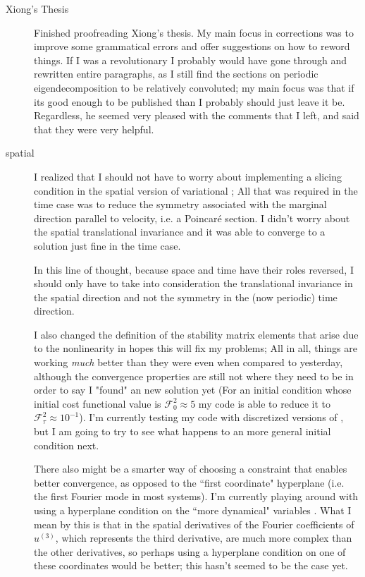 \begin{description}
{\begin{description}
\item[Xiong's Thesis]
Finished proofreading Xiong's thesis. My main focus in corrections was to improve
some grammatical errors and offer suggestions on how to reword things. If I was a
revolutionary I probably would have gone through and rewritten entire paragraphs, as
I still find the sections on periodic eigendecomposition to be relatively convoluted;
my main focus was that if its good enough to be published than I probably should just
leave it be. Regardless, he seemed very pleased with the comments that I left, and said
that they were very helpful.

\item[spatial {\descent}]
I realized that I should not have to worry about implementing a slicing condition
in the spatial version of variational {\descent}; All that was required in the
time case was to reduce the symmetry associated with the marginal direction parallel to
velocity, i.e. a Poincar\'e section. I didn't worry about the spatial translational invariance
and it was able to converge to a solution just fine in the time case.

In this line of thought, because space and time have their roles
reversed, I should only have to take into consideration the translational
invariance in the spatial direction and not the  symmetry in the (now periodic)
time direction.

I also changed the definition of the stability matrix elements that arise due
to the nonlinearity in hopes this will fix my problems; All in all, things are
working \emph{much} better than they were even when compared to yesterday,
although the convergence properties are still not where they need to be in
order to say I "found" an new solution yet (For an initial condition whose
initial cost functional value is $\mathcal{F}_0^2 \approx 5$ my code is able to
reduce it to $\mathcal{F}_{\tau}^2 \approx 10^{-1}$). I'm currently testing my
code with discretized versions of , but I am going to try to see what
happens to an more general initial condition next.

There also might be a smarter way of choosing a constraint that enables better
convergence, as opposed to the ``first coordinate" hyperplane (i.e. the first
Fourier mode in most systems). I'm currently playing around with using a
hyperplane condition on the ``more dynamical" variables . What I mean by this is that in
 the spatial derivatives of the Fourier coefficients of
$u^{(3)}$, which represents the third derivative, are much more complex than
the other derivatives, so perhaps using a hyperplane condition on one of these
coordinates would be better; this hasn't seemed to be the case yet.


\end{description}}
\end{description}
